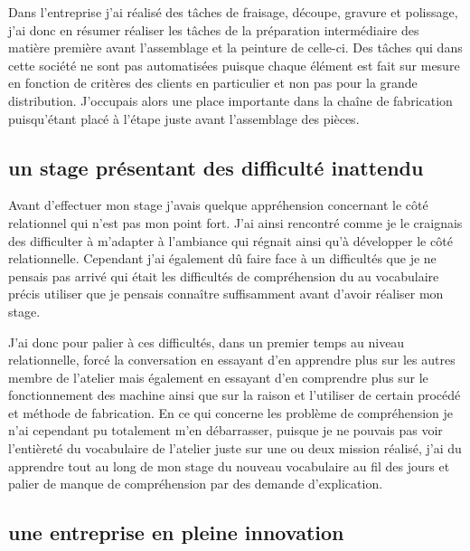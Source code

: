 Dans l'entreprise j'ai réalisé des tâches de fraisage, découpe, gravure et polissage, j'ai donc en résumer réaliser les tâches de la préparation intermédiaire des matière première avant l'assemblage et la peinture de celle-ci. Des tâches qui dans cette société ne sont pas automatisées puisque chaque élément est fait sur mesure en fonction de critères des clients en particulier et non pas pour la grande distribution.\newline
J'occupais alors une place importante dans la chaîne de fabrication puisqu'étant placé à l'étape juste avant l'assemblage des pièces.



\subsection{un stage présentant des difficulté inattendu}

Avant d'effectuer mon stage j'avais quelque appréhension concernant le côté relationnel qui n'est pas mon point fort. J'ai ainsi rencontré comme je le craignais des difficulter à m'adapter à l'ambiance qui régnait ainsi qu'à développer le côté relationnelle. Cependant j'ai également dû faire face à un difficultés que je ne pensais pas arrivé qui était les difficultés de compréhension du au vocabulaire précis utiliser que je pensais connaître suffisamment avant d'avoir réaliser mon stage.\par
J'ai donc pour palier à ces difficultés, dans un premier temps au niveau relationnelle, forcé la conversation en essayant d'en apprendre plus sur les autres membre de l'atelier mais également en essayant d'en comprendre plus sur le fonctionnement des machine ainsi que sur la raison et l'utiliser de certain procédé et méthode de fabrication. En ce qui concerne les problème de compréhension je n'ai cependant pu totalement m'en débarrasser, puisque je ne pouvais pas voir l'entièreté du vocabulaire de l'atelier juste sur une ou deux mission réalisé, j'ai du apprendre tout au long de mon stage du nouveau vocabulaire au fil des jours et palier de manque de compréhension par des demande d'explication.



\subsection{une entreprise en pleine innovation}

